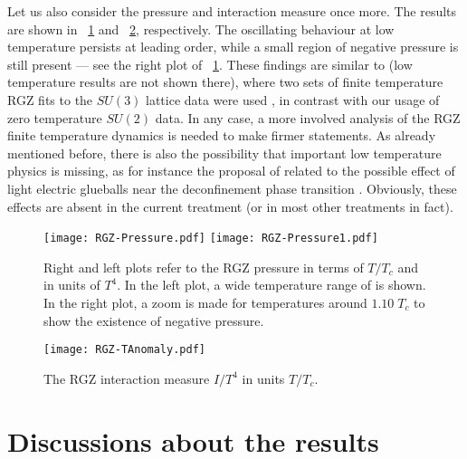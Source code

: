 Let us also consider the pressure and interaction measure once more. The results are shown in
\figurename\ \ref{rgzP} and \figurename\ \ref{rgzTraceAnom}, respectively. The oscillating
behaviour at low temperature persists at leading order, while a small region of negative
pressure is still present --- see the right plot of \figurename\ \ref{rgzP}. These findings are
similar to \cite{Fukushima:2012qa} (low temperature results are not shown there), where two
sets of finite temperature RGZ fits to the $SU(3)$ lattice data were used
\cite{Aouane:2011fv,Aouane:2012bk}, in contrast with our usage of zero temperature $SU(2)$
data. In any case, a more involved analysis of the RGZ finite temperature dynamics is needed to
make firmer statements. As already mentioned before, there is also the possibility that
important low temperature physics is missing, as for instance the proposal of
\cite{Fukushima:2012qa} related to the possible effect of light electric glueballs near the
deconfinement phase transition \cite{Ishii:2001zq,Hatta:2003ga}. Obviously, these effects are
absent in the current treatment (or in most other treatments in fact).

\begin{figure}[h]
\begin{center}
\texttt{[image: RGZ-Pressure.pdf]} \hspace{10mm}
\texttt{[image: RGZ-Pressure1.pdf]}
\end{center}
\caption{Right and left plots refer to the RGZ pressure in terms of $T/T_{c}$ and in units of $T^{4}$. In the left plot, a wide temperature range of is shown. In the right plot, a zoom is made for temperatures around $1.10\; T_{c}$ to show the existence of negative pressure.
}
\label{rgzP}
\end{figure}

\begin{figure}[h]
\begin{center}
\texttt{[image: RGZ-TAnomaly.pdf]}
\end{center}
\caption{The RGZ interaction measure $I/T^{4}$ in units $T/T_{c}$.}
\label{rgzTraceAnom}
\end{figure}



\section{Discussions about the results \label{DAR-Ploop}}


